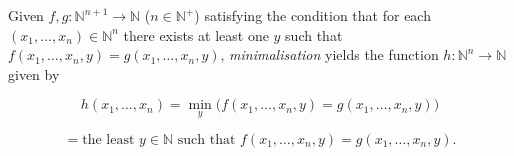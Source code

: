 Given $f, g: \mathbb{N}^{n+1} \to \mathbb{N}$ ($n \in \mathbb{N}^+$) satisfying the condition that for each $(x_1, \ldots, x_n) \in \mathbb{N}^n$ there exists at least one $y$ such that $f(x_1, \ldots, x_n, y) = g(x_1, \ldots, x_n, y)$, \textit{minimalisation} yields the function $h: \mathbb{N}^n \to \mathbb{N}$ given by

$$
h(x_1, \ldots, x_n) = \min_y \bigl( f(x_1, \ldots, x_n, y) = g(x_1, \ldots, x_n, y) \bigr)
$$

$$
= \text{the least } y \in \mathbb{N} \text{ such that } f(x_1, \ldots, x_n, y) = g(x_1, \ldots, x_n, y).
$$
